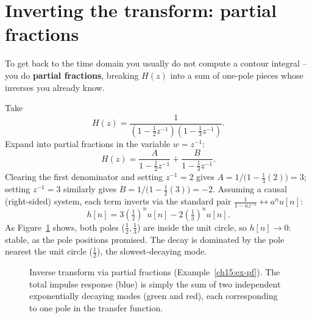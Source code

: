 \section{Inverting the transform: partial fractions}
\label{ch15:inversion}

To get back to the time domain you usually do not compute a contour integral -- you do
\textbf{partial fractions}, breaking $H(z)$ into a sum of one-pole pieces whose inverses
you already know.

\begin{example}
\label{ch15:ex-pf}
Take
\[
  H(z) = \frac{1}{(1-\tfrac12 z^{-1})(1-\tfrac13 z^{-1})}.
\]
Expand into partial fractions in the variable $w = z^{-1}$:
\[
  H(z) = \frac{A}{1-\tfrac12 z^{-1}} + \frac{B}{1-\tfrac13 z^{-1}}.
\]
Clearing the first denominator and setting $z^{-1} = 2$ gives $A = 1/\bigl(1 - \tfrac13(2)\bigr) = 3$; setting $z^{-1} = 3$ similarly gives $B = 1/\bigl(1 - \tfrac12(3)\bigr) = -2$.
Assuming a causal (right-sided) system, each term inverts via the standard pair
$\frac{1}{1-az^{-1}}\leftrightarrow a^n u[n]$:
\[
  h[n] = 3\left(\tfrac12\right)^n u[n] - 2\left(\tfrac13\right)^n u[n].
\]
As Figure~\ref{ch15:fig-pf-modes} shows, both poles ($\tfrac12,\tfrac13$) are inside the unit circle, so $h[n]\to 0$: stable, as
the pole positions promised. The decay is dominated by the pole nearest the unit circle
($\tfrac12$), the slowest-decaying mode.
\end{example}

\begin{figure}[H]
\centering
{}
\caption{Inverse transform via partial fractions (Example~\ref{ch15:ex-pf}). The total impulse response (blue) is simply the sum of two independent exponentially decaying modes (green and red), each corresponding to one pole in the transfer function.}
\label{ch15:fig-pf-modes}
\end{figure}

